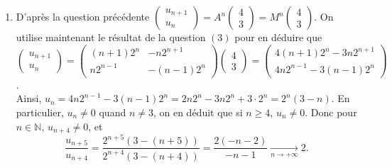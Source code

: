 \documentclass[a4paper, 10pt]{article}
\theoremstyle{plain}
\newcommand{\N}{\mathbb{N}}
\begin{document}
\begin{enumerate}
\begin{enumerate}
\item
D'après la question précédente 
$\begin{pmatrix}
u_{n+1} \\u_n
\end{pmatrix}
=A^n \begin{pmatrix}
4\\3
\end{pmatrix}
= M^n 
\begin{pmatrix}
4\\3
\end{pmatrix}$.
On utilise maintenant le résultat de la question $(3)$ pour en déduire que 
$\begin{pmatrix}
u_{n+1} \\u_n
\end{pmatrix}
=
\begin{pmatrix}
(n+1)2^n & -n2^{n+1} \\
n2^{n-1} & -(n-1)2^n
\end{pmatrix}
\begin{pmatrix}
4\\3
\end{pmatrix}
=
\begin{pmatrix}
4(n+1)2^n - 3n2^{n+1} \\
4n2^{n-1} - 3(n-1)2^n
\end{pmatrix}
$.\\
Ainsi, 
$u_n = 4n2^{n-1} -3(n-1)2^n =
2n2^n - 3n2^n +3\cdot 2^n 
=
2^n(3-n)$.
En particulier, $u_n \neq 0$ quand $n\neq 3$, on en déduit que si 
$n\geq 4$, $u_n \neq 0$.
Donc pour $n\in \N$, $u_{n+4} \neq 0$, et 
\[\frac{u_{n+5}}{u_{n+4}}=
\frac{2^{n+5}(3-(n+5))}{2^{n+4}(3-(n+4))}
=\frac{2(-n-2)}{-n-1} \xrightarrow[n\to +\infty]{} 2.\]
\end{enumerate}
\end{enumerate}
\end{document}
